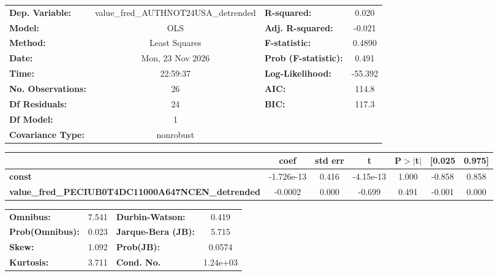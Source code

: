 \begin{center}
\begin{tabular}{lclc}
\toprule
\textbf{Dep. Variable:}                                   & value\_fred\_AUTHNOT24USA\_detrended & \textbf{  R-squared:         } &     0.020   \\
\textbf{Model:}                                           &                 OLS                  & \textbf{  Adj. R-squared:    } &    -0.021   \\
\textbf{Method:}                                          &            Least Squares             & \textbf{  F-statistic:       } &    0.4890   \\
\textbf{Date:}                                            &           Mon, 23 Nov 2026           & \textbf{  Prob (F-statistic):} &    0.491    \\
\textbf{Time:}                                            &               22:59:37               & \textbf{  Log-Likelihood:    } &   -55.392   \\
\textbf{No. Observations:}                                &                    26                & \textbf{  AIC:               } &     114.8   \\
\textbf{Df Residuals:}                                    &                    24                & \textbf{  BIC:               } &     117.3   \\
\textbf{Df Model:}                                        &                     1                & \textbf{                     } &             \\
\textbf{Covariance Type:}                                 &              nonrobust               & \textbf{                     } &             \\
\bottomrule
\end{tabular}
\begin{tabular}{lcccccc}
                                                          & \textbf{coef} & \textbf{std err} & \textbf{t} & \textbf{P$> |$t$|$} & \textbf{[0.025} & \textbf{0.975]}  \\
\midrule
\textbf{const}                                            &   -1.726e-13  &        0.416     & -4.15e-13  &         1.000        &       -0.858    &        0.858     \\
\textbf{value\_fred\_PECIUB0T4DC11000A647NCEN\_detrended} &      -0.0002  &        0.000     &    -0.699  &         0.491        &       -0.001    &        0.000     \\
\bottomrule
\end{tabular}
\begin{tabular}{lclc}
\textbf{Omnibus:}       &  7.541 & \textbf{  Durbin-Watson:     } &    0.419  \\
\textbf{Prob(Omnibus):} &  0.023 & \textbf{  Jarque-Bera (JB):  } &    5.715  \\
\textbf{Skew:}          &  1.092 & \textbf{  Prob(JB):          } &   0.0574  \\
\textbf{Kurtosis:}      &  3.711 & \textbf{  Cond. No.          } & 1.24e+03  \\
\bottomrule
\end{tabular}
\end{center}

